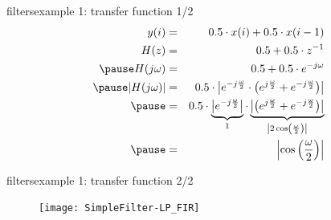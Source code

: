 	\begin{frame}{filters}{example 1: transfer function 1/2}
    	\begin{eqnarray*}
	        		y(i) &=& 0.5\cdot x(i) + 0.5\cdot x(i-1)\\
	        		H(z) &=& 0.5  + 0.5\cdot z^{-1}\\
	       	\pause
	        		H(j\omega) &=& 0.5  + 0.5\cdot e^{-j\omega}\\
	       	\pause
	       			|H(j\omega)| &=&0.5 \cdot \left| e^{-j\frac{\omega}{2}} \cdot \left( e^{j\frac{\omega}{2}} + e^{-j\frac{\omega}{2}}\right)\right| \\
	       	\pause
	       				&=&0.5 \cdot \underbrace{\left| e^{-j\frac{\omega}{2}}\right|}_{1} \cdot  \underbrace{\left|\left( e^{j\frac{\omega}{2}} + e^{-j\frac{\omega}{2}}\right)\right|}_{\left| 2\cos\left(\frac{\omega}{2}\right) \right|} \\
	       	\pause
	       	&=& \left| \cos\left(\frac{\omega}{2}\right) \right|
    	\end{eqnarray*}
	\end{frame}	
	
	\begin{frame}{filters}{example 1: transfer function 2/2}
		\begin{figure}
			\centerline{\texttt{[image: SimpleFilter-LP\_FIR]}}
		\end{figure}
	\end{frame}	
	
